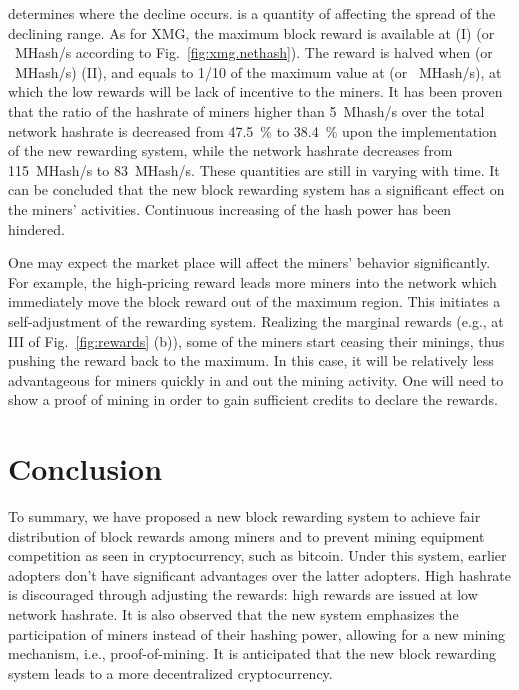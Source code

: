 \documentclass[aps,prl,reprint,showpacs,groupedaddress,letterpaper]{revtex4-1}
\begin{document}
 determines where the decline occurs.  is a quantity of affecting the spread of the declining range. As for XMG, the maximum block reward is available at  (I) (or ~MHash/s according to Fig.~\ref{fig:xmg.nethash}). The reward is halved when  (or ~MHash/s)  (II), and equals to 1/10 of the maximum value at  (or ~MHash/s), at which the low rewards will be lack of incentive to the miners. It has been proven that the ratio of the hashrate of miners higher than 5~Mhash/s over the total network hashrate is decreased from 47.5~\% to 38.4~\% upon the implementation of the new rewarding system, while the network hashrate decreases from 115~MHash/s to 83~MHash/s. These quantities are still in varying with time. It can be concluded that the new block rewarding system has a significant effect on the miners' activities. Continuous increasing of the hash power has been hindered.  

One may expect the market place will affect the miners' behavior significantly. For example, the high-pricing reward leads more miners into the network which immediately move the block reward out of the maximum region. This initiates a self-adjustment of the  rewarding system. Realizing the marginal rewards (e.g., at III of Fig.~\ref{fig:rewards} (b)), some of the miners start ceasing their minings, thus pushing the reward back to the maximum. In this case, it will be relatively less advantageous for miners quickly in and out the mining activity. One will need to show a proof of mining in order to gain sufficient credits to declare the rewards. 

\section{Conclusion}

To summary, we have proposed a new block rewarding system to achieve fair distribution of block rewards among miners and to prevent mining equipment competition as seen in cryptocurrency, such as bitcoin. Under this system, earlier adopters don't have significant advantages over the latter adopters. High hashrate is discouraged through adjusting the rewards: high rewards are issued at low network hashrate. It is also observed that the new system emphasizes the participation of miners instead of their hashing power, allowing for a new mining mechanism, i.e., proof-of-mining. It is anticipated that the new block rewarding system leads to a more decentralized cryptocurrency. 
\end{document}
